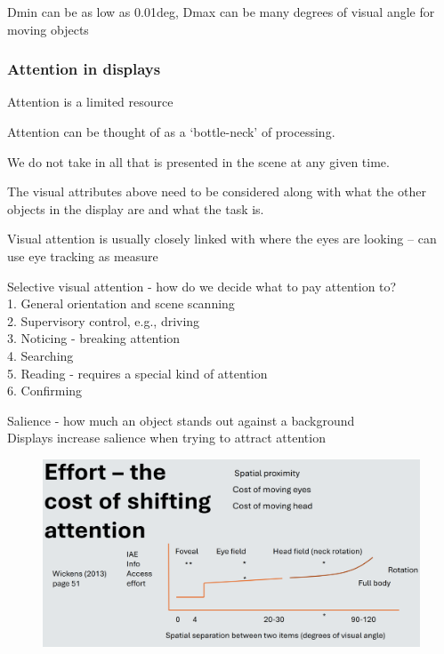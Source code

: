 \documentclass[]{project_plan}
\begin{document}
Dmin can be as low as 0.01deg, Dmax can be many degrees of visual angle for moving
objects

\subsubsection{Attention in displays}
Attention is a limited resource

Attention can be thought of as a ‘bottle-neck’ of processing.

We do not take in all that is presented in the scene at any given time.

The visual attributes above need to be considered along with what the other objects
in the display are and what the task is.

Visual attention is usually closely linked with where the eyes are looking
– can use eye tracking as measure

Selective visual attention - how do we decide what to pay attention to?\\
1. General orientation and scene scanning\\
2. Supervisory control, e.g., driving\\
3. Noticing - breaking attention\\
4. Searching\\
5. Reading - requires a special kind of attention\\
6. Confirming

Salience - how much an object stands out against a background\\
Displays increase salience when trying to attract attention

\newpage

\begin{figure}[h!]
  \centering
  \includegraphics[width=\linewidth]{the_cost_of_shifting_attention.png}
\end{figure}
\end{document}
